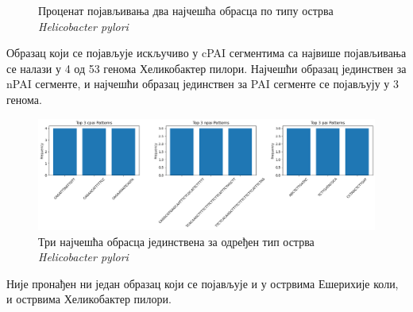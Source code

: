 \documentclass[12pt]{article}
\begin{document}
\begin{figure}[htbp]
\begin{subfigure}{0.48\linewidth}
    \end{subfigure}
    \caption{Проценат појављивања два најчешћа обрасца по типу острва \textit{Helicobacter pylori}}
    \vspace{0.5cm}
\end{figure}

Образац који се појављује искључиво у cPAI сегментима са највише појављивања се налази у 4 од 53 генома Хеликобактер пилори. Најчешћи образац јединствен за nPAI сегменте, и најчешћи образац јединствен за PAI сегменте се појављују у 3 генома.

\begin{figure}[htbp]
    \vspace{0.2cm}
    \centering
    \includegraphics[width=\linewidth]{images/top_3_by_islands_h_pylori.png}
    \caption{Три најчешћа обрасца јединствена за одређен тип острва \textit{Helicobacter pylori}}
    \label{fig:top3_by_islands}
    \vspace{0.4cm}
\end{figure}

Није пронађен ни један образац који се појављује и у острвима Ешерихије коли, и острвима Хеликобактер пилори.

\clearpage
\newpage

\end{document}
